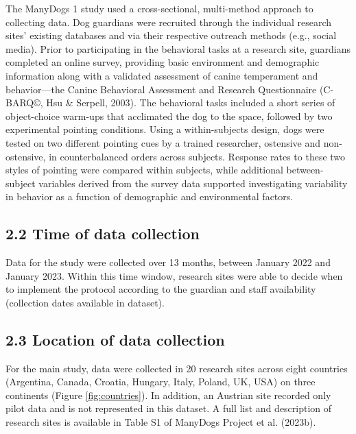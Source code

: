 \documentclass[
  man,floatsintext]{apa6}
\begin{document}
The ManyDogs 1 study used a cross-sectional, multi-method approach to collecting data. Dog guardians were recruited through the individual research sites' existing databases and via their respective outreach methods (e.g., social media). Prior to participating in the behavioral tasks at a research site, guardians completed an online survey, providing basic environment and demographic information along with a validated assessment of canine temperament and behavior---the Canine Behavioral Assessment and Research Questionnaire (C-BARQ©, Hsu \& Serpell, 2003). The behavioral tasks included a short series of object-choice warm-ups that acclimated the dog to the space, followed by two experimental pointing conditions. Using a within-subjects design, dogs were tested on two different pointing cues by a trained researcher, ostensive and non-ostensive, in counterbalanced orders across subjects. Response rates to these two styles of pointing were compared within subjects, while additional between-subject variables derived from the survey data supported investigating variability in behavior as a function of demographic and environmental factors.

\hypertarget{time-of-data-collection}{%
\subsection{2.2 Time of data collection}\label{time-of-data-collection}}

Data for the study were collected over 13 months, between January 2022 and January 2023. Within this time window, research sites were able to decide when to implement the protocol according to the guardian and staff availability (collection dates available in dataset).

\hypertarget{location-of-data-collection}{%
\subsection{2.3 Location of data collection}\label{location-of-data-collection}}

For the main study, data were collected in 20 research sites across eight countries (Argentina, Canada, Croatia, Hungary, Italy, Poland, UK, USA) on three continents (Figure \ref{fig:countries}). In addition, an Austrian site recorded only pilot data and is not represented in this dataset. A full list and description of research sites is available in Table S1 of ManyDogs Project et al. (2023b).
\end{document}
